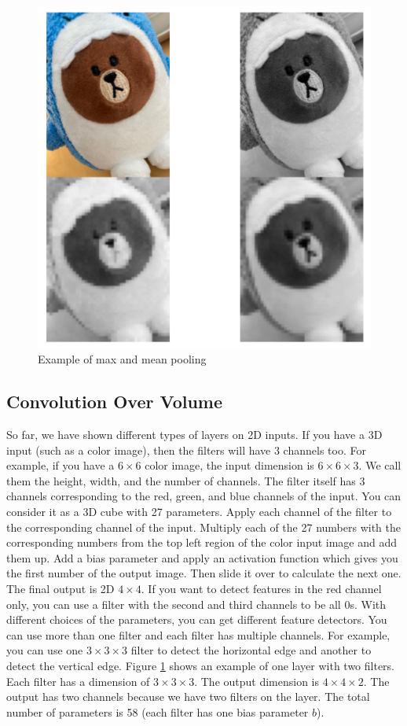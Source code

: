 \documentclass[
  12pt,
]{krantz}
\begin{document}
\begin{figure}

{\centering \includegraphics[width=0.7\linewidth]{images/eggshellconv} 

}

\caption{Example of max and mean pooling}\label{fig:eggshellconv}
\end{figure}

\hypertarget{convolution-over-volume}{%
\subsection{Convolution Over Volume}\label{convolution-over-volume}}

So far, we have shown different types of layers on 2D inputs. If you have a 3D input (such as a color image), then the filters will have 3 channels too. For example, if you have a \(6 \times 6\) color image, the input dimension is \(6 \times 6 \times 3\). We call them the height, width, and the number of channels. The filter itself has 3 channels corresponding to the red, green, and blue channels of the input. You can consider it as a 3D cube with 27 parameters. Apply each channel of the filter to the corresponding channel of the input. Multiply each of the 27 numbers with the corresponding numbers from the top left region of the color input image and add them up. Add a bias parameter and apply an activation function which gives you the first number of the output image. Then slide it over to calculate the next one. The final output is 2D \(4 \times 4\). If you want to detect features in the red channel only, you can use a filter with the second and third channels to be all 0s. With different choices of the parameters, you can get different feature detectors. You can use more than one filter and each filter has multiple channels. For example, you can use one \(3 \times 3 \times 3\) filter to detect the horizontal edge and another to detect the vertical edge. Figure \ref{fig:eggshellconv} shows an example of one layer with two filters. Each filter has a dimension of \(3 \times 3 \times 3\). The output dimension is \(4 \times 4 \times 2\). The output has two channels because we have two filters on the layer. The total number of parameters is 58 (each filter has one bias parameter \(b\)).
\end{document}
